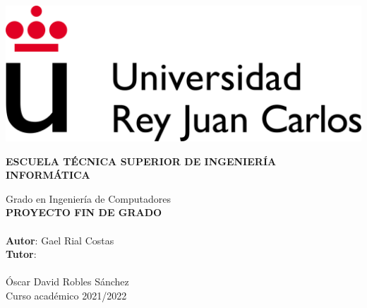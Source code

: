 \thispagestyle{empty}

\includegraphics{images/URJC_logo}
\vspace{2cm}

\begin{center}
	\large{\textbf{ESCUELA TÉCNICA SUPERIOR DE INGENIERÍA INFORMÁTICA}}
	\vspace{5mm}

 	{\Large {Grado en Ingeniería de Computadores}}
    \\
  	\vspace{34mm}
	{\large {\bf PROYECTO FIN DE GRADO}}
  	\vspace{10mm}
    \\
  	{\Large {{\Huge {
	}} \\[1cm] }}
  	\vspace{2cm}
	{\large {
        \textbf{Autor}: Gael Rial Costas\\
        \textbf{Tutor}: \\
        \\
        Óscar David Robles Sánchez\\
  	}}
	\vspace{10mm}
  	{\large {Curso académico 2021/2022}}
  	\vspace{1cm}
\end{center}
